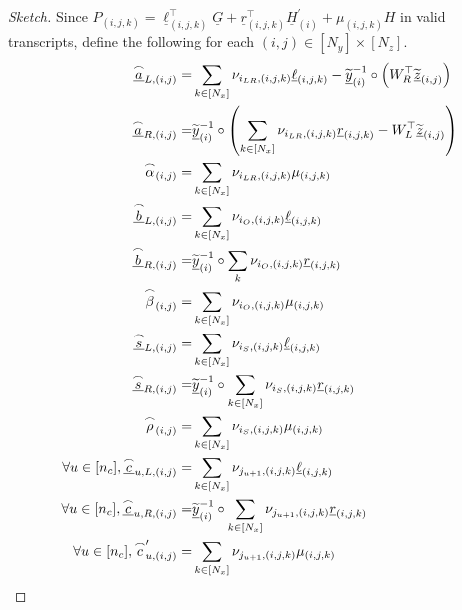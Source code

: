 \documentclass{article}
\theoremstyle{definition}
\newcommand{\zq}{\widetilde{\underline{z}}}
\newcommand{\yq}{\widetilde{\underline{y}}}
\begin{document}
\begin{proof}[Sketch]
Since $P_{(i,j,k)} = \underline{\ell}_{(i,j,k)}^\top \underline{G} + \underline{r}_{(i,j,k)}^\top \underline{H}^\prime_{(i)} + \mu_{(i,j,k)}H$ in valid transcripts, define the following for each $(i,j) \in [N_y] \times [N_z]$.
\begin{align*}  
\underline{\overset{\LARGE \frown}{\small{a}}}_{L, (i,j)} =& \sum_{k \in [N_x]} \nu_{i_{LR},(i,j,k)} \underline{\ell}_{(i,j,k)} -  \yq^{-1}_{(i)} \circ \left(W_R^\top\zq_{(i,j)}\right) \\
\underline{\overset{\LARGE \frown}{\small{a}}}_{R,(i,j)} =& \yq^{-1}_{(i)} \circ \left(\sum_{k \in [N_x]} \nu_{i_{LR},(i,j,k)}\underline{r}_{(i,j,k)}  - W_L^\top\zq_{(i,j)}\right) \\
\overset{\LARGE \frown}{\small{\alpha}}_{(i,j)} =& \sum_{k \in [N_x]} \nu_{i_{LR},(i,j,k)} \mu_{(i,j,k)}  \\
\underline{\overset{\LARGE \frown}{\small{b}}}_{L, (i,j)} =& \sum_{k \in [N_x]} \nu_{i_O,(i,j,k)} \underline{\ell}_{(i,j,k)} \\
\underline{\overset{\LARGE \frown}{\small{b}}}_{R, (i,j)} =& \yq^{-1}_{(i)} \circ \sum_k \nu_{i_O,(i,j,k)} \underline{r}_{(i,j,k)} \\
\overset{\LARGE \frown}{\small{\beta}}_{(i,j)} =& \sum_{k \in [N_x]} \nu_{i_O, (i,j,k)} \mu_{(i,j,k)}  \\
\underline{\overset{\LARGE \frown}{\small{s}}}_{L, (i,j)} =& \sum_{k \in [N_x]} \nu_{i_S, (i,j,k)}\underline{\ell}_{(i,j,k)} \\
\underline{\overset{\LARGE \frown}{\small{s}}}_{R, (i,j)} =& \yq^{-1}_{(i)} \circ \sum_{k \in [N_x]} \nu_{i_S, (i,j,k)}\underline{r}_{(i,j,k)} \\
\overset{\LARGE \frown}{\small{\rho}}_{(i,j)} =& \sum_{k \in [N_x]} \nu_{i_S, (i,j,k)}\mu_{(i,j,k)}  \\
\forall u \in [n_c], \underline{\overset{\LARGE \frown}{\small{c}}}_{u,L,(i,j)} =& \sum_{k \in [N_x]} \nu_{j_{u+1}, (i,j,k)} \underline{\ell}_{(i,j,k)}\\
\forall u \in [n_c], \underline{\overset{\LARGE \frown}{\small{c}}}_{u,R,(i,j)} =& \yq^{-1}_{(i)} \circ  \sum_{k \in [N_x]} \nu_{j_{u+1}, (i,j,k)} \underline{r}_{(i,j,k)}\\
\forall u \in [n_c], \overset{\LARGE \frown}{\small{c}}_{u, (i,j)}^\prime =& \sum_{k \in [N_x]} \nu_{j_{u+1}, (i,j,k)} \mu_{(i,j,k)} 
\end{align*}


\end{proof}
\end{document}
